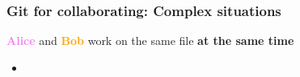 \documentclass[xcolor=x11names,compress]{beamer}
\renewcommand{\(}{\begin{columns}}
\renewcommand{\)}{\end{columns}}
\newcommand{\<}[1]{\begin{column}{#1}}
\renewcommand{\>}{\end{column}}
\begin{document}
\begin{frame}
\frametitle{Git for collaborating: Complex situations}
\textcolor{violet}{\textbf{Alice}} and \textcolor{orange}{\textbf{Bob}} work on the same file \textbf{at the same time}
\pause
\begin{itemize}
\item[]

\end{itemize}
\end{frame}
\end{document}
